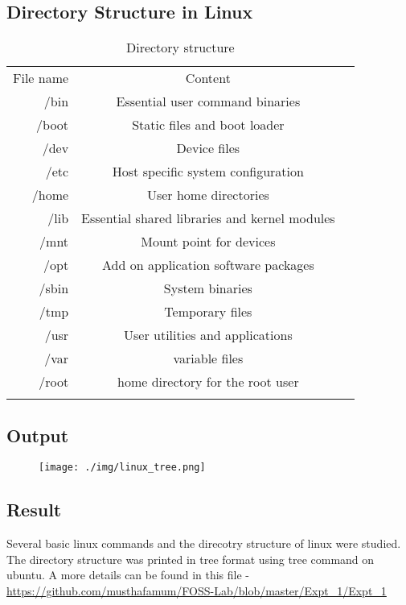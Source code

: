 \documentclass{article}
\begin{document}
\newpage

\subsection{Directory Structure in Linux}
\begin{table}[htb]
\caption{Directory structure}
\label{Directory Structure in Linux}
\begin{tabular}{rcc}
\noalign{\smallskip} \hline \hline \noalign{\smallskip}
File name & Content\\
/bin & Essential user command binaries\\
/boot & Static files and boot loader\\
/dev & Device files\\
/etc & Host specific system configuration\\
/home & User home directories\\
/lib & Essential shared libraries and kernel modules\\
/mnt & Mount point for devices\\
/opt & Add on application software packages\\
/sbin & System binaries\\
/tmp & Temporary files\\
/usr & User utilities and applications\\
/var &variable files\\
/root & home directory for the root user\\ 
\hline
\noalign{\smallskip} \hline \noalign{\smallskip}
\end{tabular}
\end{table}


\subsection{Output}
\begin{figure}[h!]
	\texttt{[image: ./img/linux\_tree.png]}
\end{figure}

\subsection{Result}
Several basic linux commands and the direcotry structure of linux were studied. The directory structure was printed in tree format using tree command on ubuntu. A more details can be found in this file - \url{https://github.com/musthafamum/FOSS-Lab/blob/master/Expt_1/Expt_1}
\begin{refsection}
\cite{commands}
\cite{directorystructure}
\printbibliography
\end{refsection}
\newpage
\end{document}
